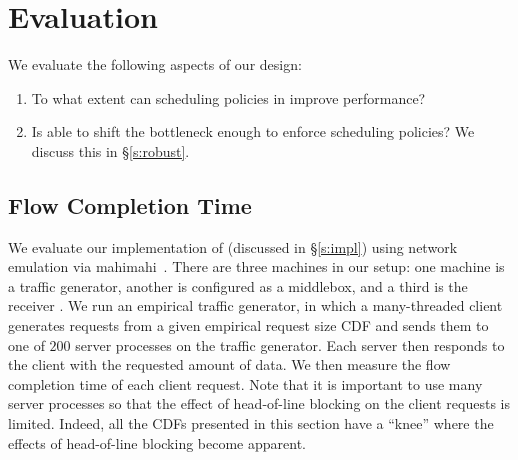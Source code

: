 \section{Evaluation}\label{s:eval}

We evaluate the following aspects of our design:
\begin{enumerate}
    \item To what extent can scheduling policies in \name improve performance?
    \item Is \name able to shift the bottleneck enough to enforce scheduling policies? We discuss this in \S\ref{s:robust}.
\end{enumerate}

\subsection{Flow Completion Time}\label{s:eval:fct}



We evaluate our implementation of \name (discussed in \S\ref{s:impl}) using network emulation via mahimahi~\cite{mahimahi}. 
There are three machines in our setup: one machine is a traffic generator, another is configured as a middlebox, and a third is the receiver .
We run an empirical traffic generator, in which a many-threaded client  generates requests from a given empirical request size CDF  and sends them to one of $200$ server processes on the traffic generator.
Each server then responds to the client with the requested amount of data.
We then measure the flow completion time of each client request.
Note that it is important to use many server processes so that the effect of head-of-line blocking on the client requests is limited.
Indeed, all the CDFs presented in this section have a ``knee'' where the effects of head-of-line blocking become apparent.

